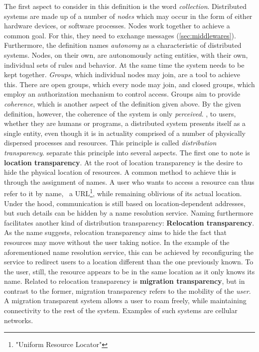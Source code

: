 The first aspect to consider in this definition is the word \emph{collection}. Distributed systems are made up of a number of \emph{nodes} which may occur in the form of either hardware devices, or software processes. Nodes work together to achieve a common goal. For this, they need to exchange messages (\cf \autoref{sec:middlewares}). Furthermore, the definition names \emph{autonomy} as a characteristic of distributed systems. Nodes, on their own, are autonomously acting entities, with their own, individual sets of rules and behavior. At the same time the system needs to be kept together. \emph{Groups}, which individual nodes may join, are a tool to achieve this. There are open groups, which every node may join, and closed groups, which employ an authorization mechanism to control access. 
Groups aim to provide \emph{coherence}, which is another aspect of the definition given above. By the given definition, however, the coherence of the system is only \emph{perceived}. \Ie , to users, whether they are humans or programs, a distributed system presents itself as a single entity, even though it is in actuality comprised of a number of physically dispersed processes and resources. This principle is called \emph{distribution transparency}. \citeauthor*{tanenbaum2017distributed} \cite{tanenbaum2017distributed} separate this principle into several aspects. The first one to note is \textbf{location transparency}. At the root of location transparency is the desire to hide the physical location of resources. A common method to achieve this is through the assignment of names. A user who wants to access a resource can thus refer to it by name, \eg\ a URL\footnote{"Uniform Resource Locator"}, while remaining oblivious of its actual location. Under the hood, communication is still based on location-dependent addresses, but such details can be hidden by a name resolution service. Naming furthermore facilitates another kind of distribution transparency: \textbf{Relocation transparency}. As the name suggests, relocation transparency aims to hide the fact that resources may move without the user taking notice. In the example of the aforementioned name resolution service, this can be achieved by reconfiguring the service to redirect users to a location different than the one previously known. To the user, still, the resource appears to be in the same location as it only knows its name. Related to relocation transparency is \textbf{migration transparency}, but in contrast to the former, migration transparency refers to the mobility of the \emph{user}. A migration transparent system allows a user to roam freely, while maintaining connectivity to the rest of the system. Examples of such systems are cellular networks.

